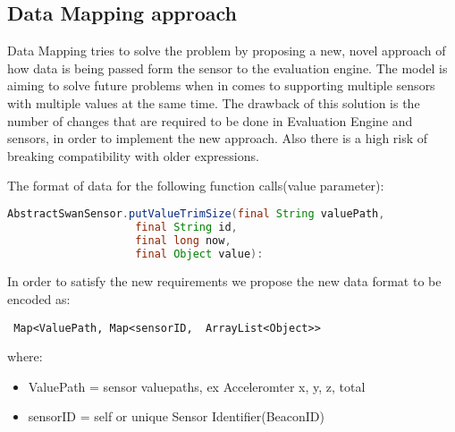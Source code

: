 \subsection{Data Mapping approach}
Data Mapping tries to solve the problem by proposing a new, novel approach of how data is being passed form the sensor
to the evaluation engine. The model is aiming to solve future problems when in comes to supporting multiple sensors
with multiple values at the same time. The drawback of this solution is the number of changes that are required to be done in
Evaluation Engine and sensors, in order to implement the new approach. Also there is a high risk of breaking compatibility
with older expressions.

The format of data for the following function calls(value parameter):
\begin{lstlisting}[language=Java]
 AbstractSwanSensor.putValueTrimSize(final String valuePath,
					final String id,
					final long now,
					final Object value):
\end{lstlisting}

In order to satisfy the new requirements we propose the new data format to be encoded as: \begin{verbatim} Map<ValuePath, Map<sensorID,  ArrayList<Object>> \end{verbatim}

where:
\begin{itemize}
 \item ValuePath  = sensor valuepaths, ex Acceleromter x, y, z, total
 \item sensorID  =  self or unique Sensor Identifier(BeaconID)
\end{itemize}


